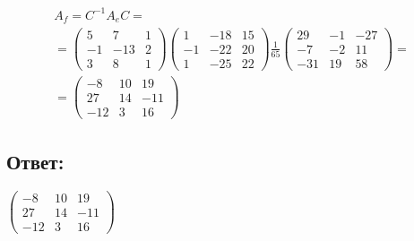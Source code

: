 \documentclass[12pt]{article}
\begin{document}
    \begin{multline*}
        A_f
        = C^{-1} A_e C = \\
        = \begin{pmatrix}
              5  & 7   & 1 \\
              -1 & -13 & 2 \\
              3  & 8   & 1
        \end{pmatrix}
        \begin{pmatrix}
            1  & - 18 & 15 \\
            -1 & -22  & 20 \\
            1  & -25  & 22
        \end{pmatrix}
        \frac{1}{65}
        \begin{pmatrix}
            29  & -1 & -27 \\
            -7  & -2 & 11  \\
            -31 & 19 & 58
        \end{pmatrix} = \\
        =
        \begin{pmatrix}
            -8  & 10 & 19  \\
            27  & 14 & -11 \\
            -12 & 3  & 16
        \end{pmatrix}
    \end{multline*}

    \subsection*{Ответ:}
    $
    \begin{pmatrix}
        -8  & 10 & 19  \\
        27  & 14 & -11 \\
        -12 & 3  & 16
    \end{pmatrix}
    $
\end{document}
